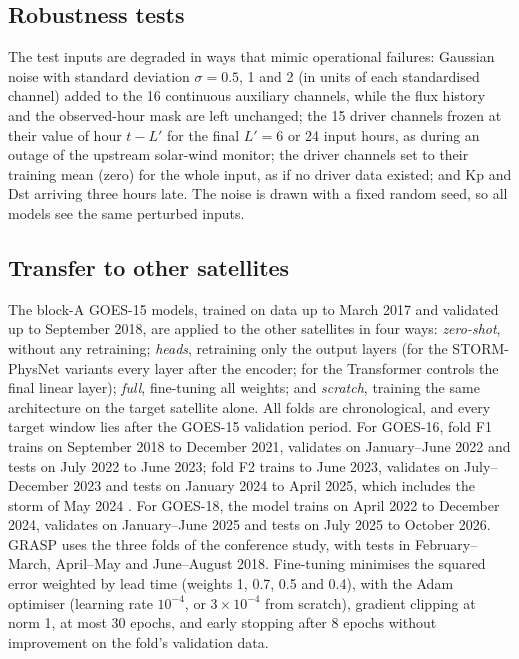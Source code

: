 \documentclass[a4paper,fleqn]{cas-dc}
\begin{document}
\subsection{Robustness tests}
The test inputs are degraded in ways that mimic operational failures: Gaussian noise with standard deviation
\(\sigma=0.5\), 1 and 2 (in units of each standardised channel) added to the 16 continuous auxiliary channels,
while the flux history and the observed-hour mask are left unchanged; the 15 driver channels frozen at their
value of hour \(t-L'\) for the final \(L'=6\) or 24 input hours, as during an outage of the upstream solar-wind
monitor; the driver channels set to their training mean (zero) for the whole input, as if no driver data existed;
and Kp and Dst arriving three hours late. The noise is drawn with a fixed random seed, so all models see the same
perturbed inputs.

\subsection{Transfer to other satellites}
The block-A GOES-15 models, trained on data up to March 2017 and validated up to September 2018, are applied to
the other satellites in four ways: \emph{zero-shot}, without any retraining; \emph{heads}, retraining only the
output layers (for the STORM-PhysNet variants every layer after the encoder; for the Transformer controls the
final linear layer); \emph{full}, fine-tuning all weights; and \emph{scratch}, training the same architecture on
the target satellite alone. All folds are chronological, and every target window lies after the GOES-15
validation period. For GOES-16, fold F1 trains on September 2018 to December 2021, validates on January--June 2022
and tests on July 2022 to June 2023; fold F2 trains to June 2023, validates on July--December 2023 and tests on
January 2024 to April 2025, which includes the storm of May 2024 \citep{pierrard2024}. For GOES-18, the model
trains on April 2022 to December 2024, validates on January--June 2025 and tests on July 2025 to October 2026.
GRASP uses the three folds of the conference study, with tests in February--March, April--May and
June--August 2018. Fine-tuning minimises the squared error weighted by lead time (weights 1, 0.7, 0.5 and 0.4),
with the Adam optimiser \citep{kingma2015} (learning rate \(10^{-4}\), or \(3\times10^{-4}\) from scratch),
gradient clipping at norm 1, at most 30 epochs, and early stopping after 8 epochs without improvement on the
fold's validation data.
\end{document}
